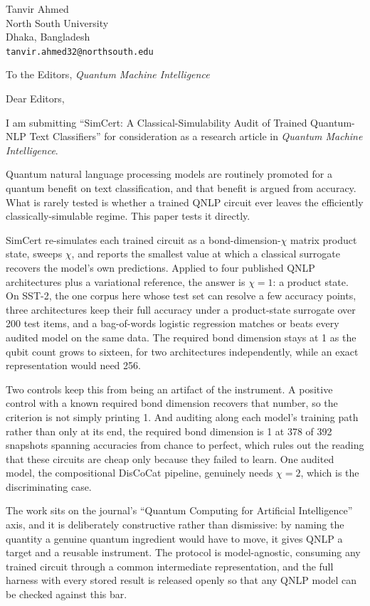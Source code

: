 \documentclass[11pt,a4paper]{article}
\begin{document}
\noindent
Tanvir Ahmed\\
North South University\\
Dhaka, Bangladesh\\
\texttt{tanvir.ahmed32@northsouth.edu}

\vspace{1em}
\noindent
To the Editors, \emph{Quantum Machine Intelligence}

\vspace{1em}
\noindent
Dear Editors,

I am submitting ``SimCert: A Classical-Simulability Audit of Trained Quantum-NLP Text
Classifiers'' for consideration as a research article in \emph{Quantum Machine Intelligence}.

Quantum natural language processing models are routinely promoted for a quantum benefit on text
classification, and that benefit is argued from accuracy. What is rarely tested is whether a
trained QNLP circuit ever leaves the efficiently classically-simulable regime. This paper tests
it directly.

SimCert re-simulates each trained circuit as a bond-dimension-$\chi$ matrix product state, sweeps
$\chi$, and reports the smallest value at which a classical surrogate recovers the model's own
predictions. Applied to four published QNLP architectures plus a variational reference, the answer
is $\chi=1$: a product state. On SST-2, the one corpus here whose test set can resolve a few
accuracy points, three architectures keep their full accuracy under a product-state surrogate over
200 test items, and a bag-of-words logistic regression matches or beats every audited model on the
same data. The required bond dimension stays at 1 as the qubit count grows to sixteen, for two
architectures independently, while an exact representation would need 256.

Two controls keep this from being an artifact of the instrument. A positive control with a known
required bond dimension recovers that number, so the criterion is not simply printing 1. And
auditing along each model's training path rather than only at its end, the required bond dimension
is 1 at 378 of 392 snapshots spanning accuracies from chance to perfect, which rules out the
reading that these circuits are cheap only because they failed to learn. One audited model, the
compositional DisCoCat pipeline, genuinely needs $\chi=2$, which is the discriminating case.

The work sits on the journal's ``Quantum Computing for Artificial Intelligence'' axis, and it is
deliberately constructive rather than dismissive: by naming the quantity a genuine quantum
ingredient would have to move, it gives QNLP a target and a reusable instrument. The protocol is
model-agnostic, consuming any trained circuit through a common intermediate representation, and
the full harness with every stored result is released openly so that any QNLP model can be checked
against this bar.
\end{document}
